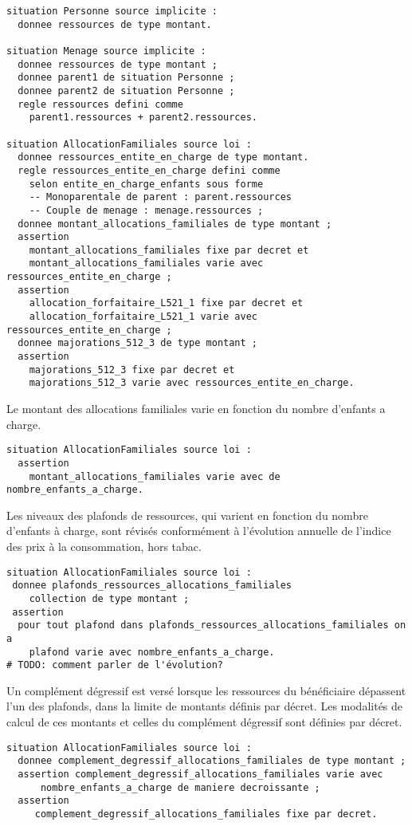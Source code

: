 \documentclass[11pt, french]{article}
\begin{document}
\begin{lstlisting}
situation Personne source implicite :
  donnee ressources de type montant.

situation Menage source implicite :
  donnee ressources de type montant ;
  donnee parent1 de situation Personne ;
  donnee parent2 de situation Personne ;
  regle ressources defini comme
    parent1.ressources + parent2.ressources.

situation AllocationFamiliales source loi :
  donnee ressources_entite_en_charge de type montant.
  regle ressources_entite_en_charge defini comme
    selon entite_en_charge_enfants sous forme
    -- Monoparentale de parent : parent.ressources
    -- Couple de menage : menage.ressources ;
  donnee montant_allocations_familiales de type montant ;
  assertion
    montant_allocations_familiales fixe par decret et
    montant_allocations_familiales varie avec ressources_entite_en_charge ;
  assertion
    allocation_forfaitaire_L521_1 fixe par decret et
    allocation_forfaitaire_L521_1 varie avec ressources_entite_en_charge ;
  donnee majorations_512_3 de type montant ;
  assertion
    majorations_512_3 fixe par decret et
    majorations_512_3 varie avec ressources_entite_en_charge.
\end{lstlisting}
Le montant des allocations familiales varie en fonction du nombre d'enfants a charge.
\begin{lstlisting}
situation AllocationFamiliales source loi :
  assertion
    montant_allocations_familiales varie avec de nombre_enfants_a_charge.
\end{lstlisting}
Les niveaux des plafonds de ressources, qui varient en fonction du nombre d'enfants à charge, sont révisés conformément à l'évolution annuelle de l'indice des prix à la consommation, hors tabac.
\begin{lstlisting}
situation AllocationFamiliales source loi :
 donnee plafonds_ressources_allocations_familiales
    collection de type montant ;
 assertion
  pour tout plafond dans plafonds_ressources_allocations_familiales on a
    plafond varie avec nombre_enfants_a_charge.
# TODO: comment parler de l'évolution?
\end{lstlisting}
Un complément dégressif est versé lorsque les ressources du bénéficiaire dépassent l'un des plafonds, dans la limite de montants définis par décret. Les modalités de calcul de ces montants et celles du complément dégressif sont définies par décret.
\begin{lstlisting}
situation AllocationFamiliales source loi :
  donnee complement_degressif_allocations_familiales de type montant ;
  assertion complement_degressif_allocations_familiales varie avec
      nombre_enfants_a_charge de maniere decroissante ;
  assertion
     complement_degressif_allocations_familiales fixe par decret.
\end{lstlisting}
\end{document}
